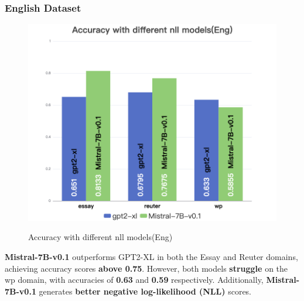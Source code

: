 \documentclass[lettersize,journal]{IEEEtran}
\begin{document}
\subsubsection{English Dataset}
    \begin{figure}[H]
        \centering
        \includegraphics[width=0.8\linewidth]{images/Accuracy with different nll models(Eng).png}
        \label{fig:enter-label}
        \caption{Accuracy with different nll models(Eng)}
    \end{figure}
    
\textbf{Mistral-7B-v0.1} outperforms GPT2-XL in both the Essay and Reuter domains, achieving accuracy scores \textbf{above 0.75}. However, both models \textbf{struggle} on the wp domain, with accuracies of \textbf{0.63} and \textbf{0.59} respectively. Additionally, \textbf{Mistral-7B-v0.1} generates \textbf{better negative log-likelihood (NLL)} scores.
\end{document}
